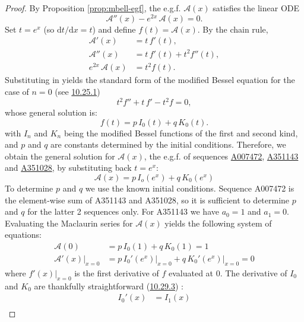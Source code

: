 \documentclass[a4paper]{amsart}
\begin{document}
\begin{proof}
By Proposition \ref{prop:mbell-egf}, the e.g.f. $\mathcal{A}(x)$ satisfies the linear ODE
\[
\mathcal{A}''(x)-e^{2x}\,\mathcal{A}(x)=0.
\]
Set $t=e^{x}$ (so $\mathrm{d}t/\mathrm{d}x=t$) and define $f(t)=\mathcal{A}(x)$.  By the chain rule,
\[
\begin{aligned}
\mathcal{A}'(x) &= t\,f'(t),\\
\mathcal{A}''(x)&= t\,f'(t)+t^{2}f''(t),\\
e^{2x}\,\mathcal{A}(x) &= t^{2}f(t).
\end{aligned}
\]
Substituting in yields the standard form of the modified Bessel equation for the case of $n=0$ (see \href{https://dlmf.nist.gov/10.25.E1}{10.25.1}) \cite{NIST:DLMF}
\begin{equation}\label{eq-m2-ode}
t^{2}f''+t\,f'-t^{2}f=0,
\end{equation}
whose general solution is:
\[
f(t)=p\,I_0(t)+q\,K_0(t).
\]
with $I_n$ and $K_n$ being the modified Bessel functions of the first and second kind, and $p$ and $q$ are constants determined by the initial conditions. Therefore, we obtain the general solution for $\mathcal{A}(x)$, the e.g.f. of sequences \href{https://oeis.org/A007472}{A007472}, \href{https://oeis.org/A351143}{A351143} and \href{https://oeis.org/A351028}{A351028}, by substituting back $t=e^x$:
\begin{equation}\label{eq-m2-ODE-solution}
\mathcal{A}(x)=p\, I_o(e^x) + q\,K_0(e^x)
\end{equation}
To determine $p$ and $q$ we use the known initial conditions. Sequence A007472 is the element-wise sum of A351143 and A351028, so it is sufficient to determine $p$ and $q$ for the latter 2 sequences only. For A351143 we have $a_0 = 1$ and $a_1 = 0$. Evaluating the Maclaurin series for $\mathcal{A}(x)$ yields the following system of equations:
\[
\begin{aligned}
\mathcal{A}(0) & = p\, I_0(1) + q\,K_0(1) = 1 \\
\mathcal{A}'(x)\bigr|_{x=0} &=p\, I_0'(e^x)\bigr|_{x=0} + q\,K_0'(e^x)\bigr|_{x=0} = 0
\end{aligned}
\]
where $f'(x)\bigr|_{x=0}$ is the first derivative of $f$ evaluated at 0. The derivative of $I_0$ and $K_0$ are thankfully straightforward (\href{https://dlmf.nist.gov/10.29.E3}{10.29.3}) \cite{NIST:DLMF}:
\begin{equation}\label{eq-bessel-deriv1}
\begin{aligned}
I_0'(x) &= I_1(x) \\ 

\end{aligned}
\end{equation}
\end{proof}
\end{document}
